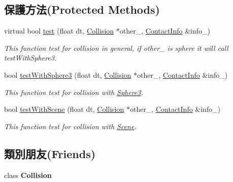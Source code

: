 \subsection*{保護方法(Protected Methods)}
\begin{DoxyCompactItemize}
\item 
virtual bool \hyperlink{class_i_dream_sky_1_1_sphere3_collision_a401bddbc02cbbe9aeb8ab9b536aba7fb}{test} (float dt, \hyperlink{class_i_dream_sky_1_1_collision}{Collision} $\ast$other\+\_\+, \hyperlink{class_i_dream_sky_1_1_collision_1_1_contact_info}{Contact\+Info} \&info\+\_\+)
\begin{DoxyCompactList}\small\item\em This function test for collision in general, if other\+\_\+ is sphere it will call test\+With\+Sphere3. \end{DoxyCompactList}\item 
bool \hyperlink{class_i_dream_sky_1_1_sphere3_collision_a7d3bd58c5d443ca38cfc060057298be6}{test\+With\+Sphere3} (float dt, \hyperlink{class_i_dream_sky_1_1_collision}{Collision} $\ast$other\+\_\+, \hyperlink{class_i_dream_sky_1_1_collision_1_1_contact_info}{Contact\+Info} \&info\+\_\+)
\begin{DoxyCompactList}\small\item\em This function test for collision with \hyperlink{class_i_dream_sky_1_1_sphere3}{Sphere3}. \end{DoxyCompactList}\item 
bool \hyperlink{class_i_dream_sky_1_1_sphere3_collision_a412a102d642fd2e0d55cbeb882ff83a3}{test\+With\+Scene} (float dt, \hyperlink{class_i_dream_sky_1_1_collision}{Collision} $\ast$other\+\_\+, \hyperlink{class_i_dream_sky_1_1_collision_1_1_contact_info}{Contact\+Info} \&info\+\_\+)
\begin{DoxyCompactList}\small\item\em This function test for collision with \hyperlink{class_i_dream_sky_1_1_scene}{Scene}. \end{DoxyCompactList}\end{DoxyCompactItemize}
\subsection*{類別朋友(Friends)}
\begin{DoxyCompactItemize}
\item 
class {\bfseries Collision}\hypertarget{class_i_dream_sky_1_1_sphere3_collision_aa08e39e5a8a0a97f10c15f0c5d98013b}{}\label{class_i_dream_sky_1_1_sphere3_collision_aa08e39e5a8a0a97f10c15f0c5d98013b}

\end{DoxyCompactItemize}
